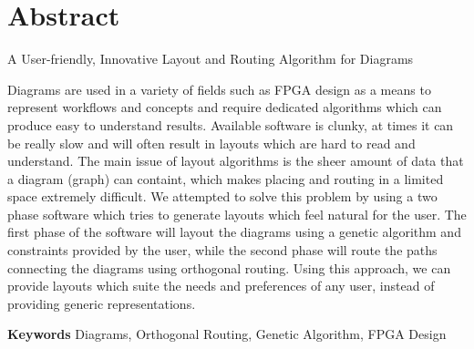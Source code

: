 \chapter*{Abstract}

A User-friendly, Innovative Layout and Routing Algorithm for Diagrams

Diagrams are used in a variety of fields such as FPGA design as a means to represent workflows and concepts and require dedicated algorithms which can produce easy to understand results. 
Available software is clunky, at times it can be really slow and will often result in layouts which are hard to read and understand. The main issue of layout algorithms is the sheer amount 
of data that a diagram (graph) can containt, which makes placing and routing in a limited space extremely difficult. We attempted to solve this problem by using a two phase software which tries 
to generate layouts which feel natural for the user. The first phase of the software will layout the diagrams using a genetic algorithm and constraints provided by the user, while the second 
phase will route the paths connecting the diagrams using orthogonal routing. Using this approach, we can provide layouts which suite the needs and preferences of any user, instead of providing 
generic representations.

\textbf{Keywords} Diagrams, Orthogonal Routing, Genetic Algorithm, FPGA Design 

